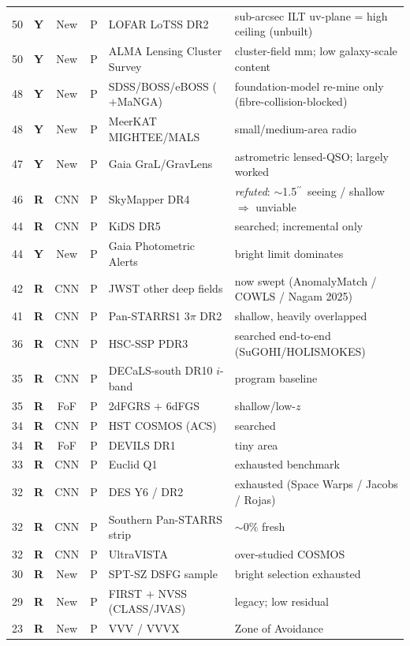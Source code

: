 \documentclass[11pt,letterpaper]{article}
\providecommand{\arcsec}{\ensuremath{^{\prime\prime}}}
\newcommand{\rgY}{\textcolor{orange!85!black}{\textbf{Y}}}
\newcommand{\rgR}{\textcolor{red!72!black}{\textbf{R}}}
\begin{document}
{\begin{longtable}{@{}r c c c >{\raggedright\arraybackslash}p{3.3cm} >{\raggedright\arraybackslash}p{6.2cm}@{}}
50 & \rgY & New & P & LOFAR LoTSS DR2 & sub-arcsec ILT uv-plane = high ceiling (unbuilt) \\
50 & \rgY & New & P & ALMA Lensing Cluster Survey & cluster-field mm; low galaxy-scale content \\
48 & \rgY & New & P & SDSS/BOSS/eBOSS ($+$MaNGA) & foundation-model re-mine only (fibre-collision-blocked) \\
48 & \rgY & New & P & MeerKAT MIGHTEE/MALS & small/medium-area radio \\
47 & \rgY & New & P & Gaia GraL/GravLens & astrometric lensed-QSO; largely worked \\
46 & \rgR & CNN & P & SkyMapper DR4 & \emph{refuted}: $\sim$1.5\arcsec\ seeing / shallow $\Rightarrow$ unviable \\
44 & \rgR & CNN & P & KiDS DR5 & searched; incremental only \\
44 & \rgY & New & P & Gaia Photometric Alerts & bright limit dominates \\
42 & \rgR & CNN & P & JWST other deep fields & now swept (AnomalyMatch / COWLS / Nagam 2025) \\
41 & \rgR & CNN & P & Pan-STARRS1 3$\pi$ DR2 & shallow, heavily overlapped \\
36 & \rgR & CNN & P & HSC-SSP PDR3 & searched end-to-end (SuGOHI/HOLISMOKES) \\
35 & \rgR & CNN & P & DECaLS-south DR10 $i$-band & program baseline \\
35 & \rgR & FoF & P & 2dFGRS $+$ 6dFGS & shallow/low-$z$ \\
34 & \rgR & CNN & P & HST COSMOS (ACS) & searched \\
34 & \rgR & FoF & P & DEVILS DR1 & tiny area \\
33 & \rgR & CNN & P & Euclid Q1 & exhausted benchmark \\
32 & \rgR & CNN & P & DES Y6 / DR2 & exhausted (Space Warps / Jacobs / Rojas) \\
32 & \rgR & CNN & P & Southern Pan-STARRS strip & $\sim$0\% fresh \\
32 & \rgR & CNN & P & UltraVISTA & over-studied COSMOS \\
30 & \rgR & New & P & SPT-SZ DSFG sample & bright selection exhausted \\
29 & \rgR & New & P & FIRST $+$ NVSS (CLASS/JVAS) & legacy; low residual \\
23 & \rgR & New & P & VVV / VVVX & Zone of Avoidance \\
\end{longtable}}
\end{document}
